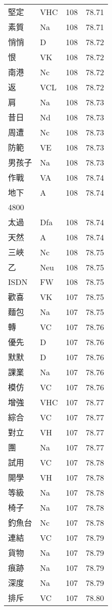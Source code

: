 \documentclass[twocolumn]{book}
\begin{document}
\begin{supertabular}{llrr}
堅定 & VHC & 108 &  78.71\\
素質 & Na & 108 &  78.71\\
悄悄 & D & 108 &  78.72\\
恨 & VK & 108 &  78.72\\
南港 & Nc & 108 &  78.72\\
返 & VCL & 108 &  78.72\\
肩 & Na & 108 &  78.73\\
昔日 & Nd & 108 &  78.73\\
周遭 & Nc & 108 &  78.73\\
防範 & VE & 108 &  78.73\\
男孩子 & Na & 108 &  78.73\\
作戰 & VA & 108 &  78.74\\
地下 & A & 108 &  78.74\\
4800\\
太過 & Dfa & 108 &  78.74\\
天然 & A & 108 &  78.74\\
三峽 & Nc & 108 &  78.75\\
乙 & Neu & 108 &  78.75\\
ISDN & FW & 108 &  78.75\\
歡喜 & VK & 107 &  78.75\\
麵包 & Na & 107 &  78.75\\
轉 & VC & 107 &  78.76\\
優先 & D & 107 &  78.76\\
默默 & D & 107 &  78.76\\
課業 & Na & 107 &  78.76\\
模仿 & VC & 107 &  78.76\\
增強 & VHC & 107 &  78.77\\
綜合 & VC & 107 &  78.77\\
對立 & VH & 107 &  78.77\\
團 & Na & 107 &  78.77\\
試用 & VC & 107 &  78.78\\
開學 & VH & 107 &  78.78\\
等級 & Na & 107 &  78.78\\
椅子 & Na & 107 &  78.78\\
釣魚台 & Nc & 107 &  78.78\\
連結 & VC & 107 &  78.79\\
貨物 & Na & 107 &  78.79\\
痕跡 & Na & 107 &  78.79\\
深度 & Na & 107 &  78.79\\
排斥 & VC & 107 &  78.80\\

\end{supertabular}
\end{document}
